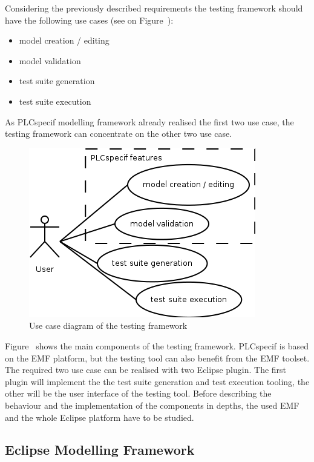 Considering the previously described requirements the testing framework should have the following use cases (see on Figure~\cite{fig:designuc}):

\begin{itemize}
	\item model creation / editing
	\item model validation
	\item test suite generation
	\item test suite execution
\end{itemize}

As PLCspecif modelling framework already realised the first two use case, the testing framework can concentrate on the other two use case.

\begin{figure}[htp]
\centering
\includegraphics[scale=0.6]{figures/design_uc.png}
\caption{Use case diagram of the testing framework}
\label{fig:designuc}
\end{figure}

Figure~\cite{fig:designcomponents} shows the main components of the testing framework. PLCspecif is based on the EMF platform, but the testing tool can also benefit from the EMF toolset. The required two use case can be realised with two Eclipse plugin. The first plugin will implement the the test suite generation and test execution tooling, the other will be the user interface of the testing tool. Before describing the behaviour and the implementation of the components in depths, the used EMF and the whole Eclipse platform have to be studied.

\subsection{Eclipse Modelling Framework}
\label{sub:emf}

